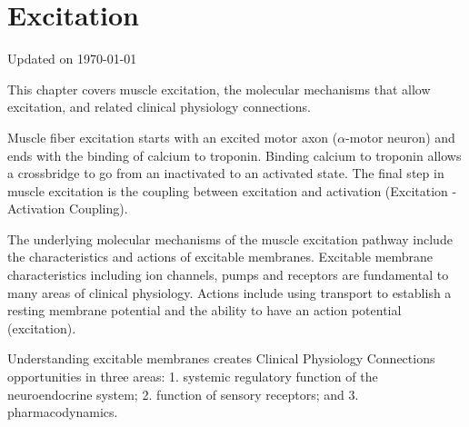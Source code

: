 \chapter{Excitation}\label{chp:excitation}
Updated on \today

\minitoc

This chapter covers muscle excitation, the molecular mechanisms that allow excitation, and related clinical physiology connections. 

Muscle fiber excitation starts with an excited motor axon ($\alpha$-motor neuron) and ends with the binding of calcium to troponin. Binding calcium to troponin allows a crossbridge to go from an inactivated to an activated state. The final step in muscle excitation is the coupling between excitation and activation (Excitation - Activation Coupling). 

The underlying molecular mechanisms of the muscle excitation pathway include the characteristics and actions of excitable membranes. Excitable membrane characteristics including ion channels, pumps and receptors are fundamental to many areas of clinical physiology. Actions include using transport to establish a resting membrane potential and the ability to have an action potential (excitation). 

Understanding excitable membranes creates Clinical Physiology Connections opportunities in three areas: 1. systemic regulatory function of the neuroendocrine system; 2. function of sensory receptors; and 3. pharmacodynamics.

